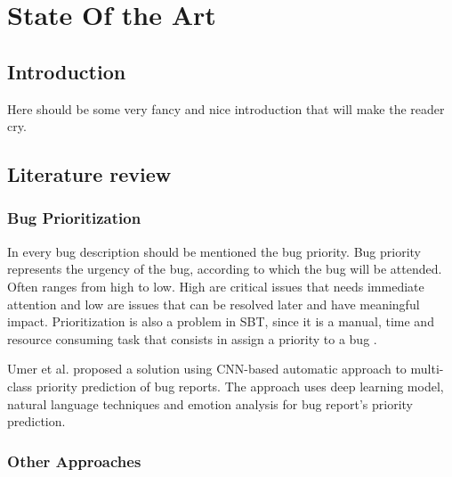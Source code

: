 
%

\chapter{State Of the Art}
\label{cha:users_manual}


\section{Introduction}
\label{sec:introduction}

	Here should be some very fancy and nice introduction that will make the reader cry.

\section{Literature review}
\label{sec:literature_review}

\subsection{Bug Prioritization}


In every bug description should be mentioned the bug priority. Bug priority represents the urgency of the bug, according to which the bug will be attended. Often ranges from high to low. High are critical issues that needs immediate attention and low are issues that can be resolved later and have meaningful impact. Prioritization is also a problem in SBT, since it is a manual, time and resource consuming task that consists in assign a priority to a bug \cite{Uddin2017}. 

Umer et al. \cite{Umer2020} proposed a solution using CNN-based automatic approach to multi-class priority prediction of bug reports. The approach uses deep learning model, natural language techniques and emotion analysis for bug report's priority prediction.

\subsection{Other Approaches}

